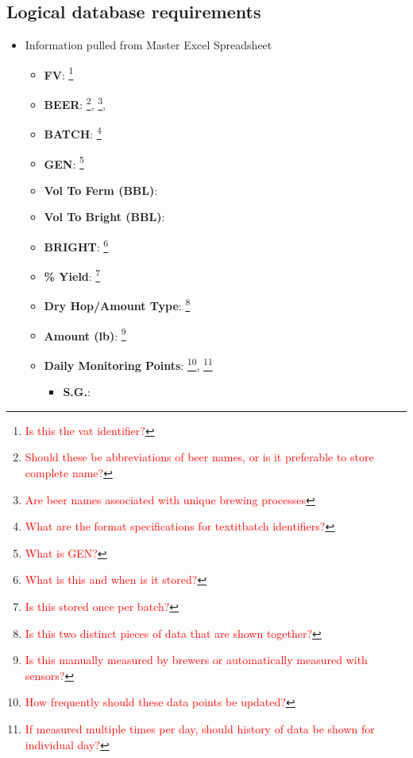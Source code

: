 \documentclass[draftclsnofoot,onecolumn,letterpaper,10pt,compsoc]{IEEEtran}
\newcommand\question[1]{\footnote{\textcolor{red}{#1}}}
\begin{document}
	\subsection{Logical database requirements}
    \begin{itemize}
        \item{Information pulled from Master Excel Spreadsheet}
            \begin{itemize}
                \item{\textbf{FV}:
                    \question{Is this the vat identifier?}
                }
                \item{\textbf{BEER}:
                    \question{Should these be abbreviations of beer names, or is it preferable to store complete name?},
                    \question{Are beer names associated with unique brewing processes},
                }
                \item{\textbf{BATCH}:
                    \question{What are the format specifications for textit{batch identifiers}?}
                }
                \item{\textbf{GEN}:
                    \question{What is GEN?}
                }
                \item{\textbf{Vol To Ferm (BBL)}:
                }
                \item{\textbf{Vol To Bright (BBL)}:
                }
                \item{\textbf{BRIGHT}:
                    \question{What is this and when is it stored?}
                }
                \item{\textbf{\% Yield}:
                    \question{Is this stored once per batch?}
                }
                \item{\textbf{Dry Hop/Amount Type}:
                    \question{Is this two distinct pieces of data that are shown together?}
                }
                \item{\textbf{Amount (lb)}:
                    \question{Is this manually measured by brewers or automatically measured with sensors?}
                }
                \item{\textbf{Daily Monitoring Points}:
                    \question{How frequently should these data points be updated?},
                    \question{If measured multiple times per day, should history of data be shown for individual day?}
                }
                \begin{itemize}
                    \item{\textbf{S.G.}:
}
\end{itemize}
\end{itemize}
\end{itemize}
\end{document}
